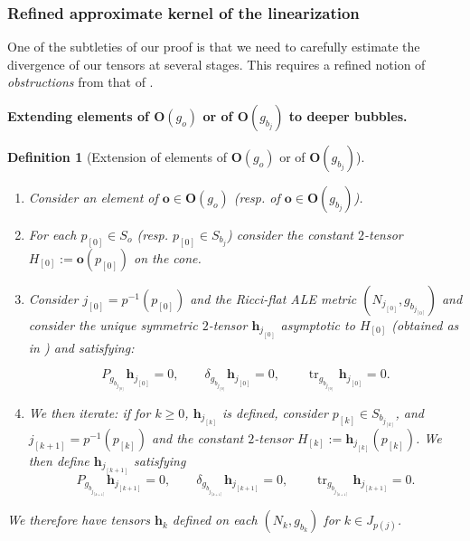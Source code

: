 \documentclass[11pt,reqno]{amsart}
\numberwithin{equation}{section}
\newtheorem{defn}[thm]{Definition}
\theoremstyle{definition}
\theoremstyle{remark}
\begin{document}
\subsubsection{Refined approximate kernel of the linearization}\label{sec: refined obst}

One of the subtleties of our proof is that we need to carefully estimate the divergence of our tensors at several stages. This requires a refined notion of \textit{obstructions} from that of \cite[Definition 4.5]{ozu2}.

\textbf{Extending elements of $\mathbf{O}(g_o)$ or of $\mathbf{O}(g_{b_j})$ to deeper bubbles.}

\begin{defn}[Extension of elements of $\mathbf{O}(g_o)$ or of $\mathbf{O}(g_{b_j})$]\label{def: ext obst}
\,
\begin{enumerate}
    \item Consider an element of $\mathbf{o}\in\mathbf{O}(g_o)$ (resp. of $\mathbf{o}\in\mathbf{O}(g_{b_j})$).
    \item For each $p_{[0]}\in S_o$ (resp. $p_{[0]}\in S_{b_j}$) consider the constant $2$-tensor $H_{[0]}:=\mathbf{o}(p_{[0]})$ on the cone.
    \item Consider $j_{[0]} = p^{-1}(p_{[0]})$ and the Ricci-flat ALE metric $(N_{j_{[0]}},g_{b_{j_{[0]}}})$ and consider the unique symmetric $2$-tensor $ \mathbf{h}_{j_{[0]}}$ asymptotic to $H_{[0]}$ (obtained as in \cite[Lemma 2.7] {ozu3}) and satisfying:
    
    \begin{equation}
        P_{g_{b_{j_{[0]}}}}\mathbf{h}_{j_{[0]}} = 0,\qquad\delta_{g_{b_{j_{[0]}}}}\mathbf{h}_{j_{[0]}} = 0,\qquad\operatorname{tr}_{g_{b_{j_{[0]}}}}\mathbf{h}_{j_{[0]}} = 0.
    \end{equation}
    \item We then iterate: if for $k\geqslant 0$, $\mathbf{h}_{j_{[k]}}$ is defined, consider $p_{[k]}\in S_{b_{j_{[k]}}}$, and $j_{[k+1]} = p^{-1}(p_{[k]})$ and the constant $2$-tensor $H_{[k]}:=\mathbf{h}_{j_{[k]}}(p_{[k]})$. We then define $\mathbf{h}_{j_{[k+1]}}$ satisfying
    \begin{equation}
        P_{g_{b_{j_{[k+1]}}}}\mathbf{h}_{j_{[k+1]}} = 0,\qquad\delta_{g_{b_{j_{[k+1]}}}}\mathbf{h}_{j_{[k+1]}} = 0,\qquad\operatorname{tr}_{g_{b_{j_{[k+1]}}}}\mathbf{h}_{j_{[k+1]}} = 0.
    \end{equation}
\end{enumerate}
We therefore have tensors $\mathbf{h}_k$ defined on each $(N_k,g_{b_k})$ for $k\in J_{p(j)}$.


\end{defn}
\end{document}
